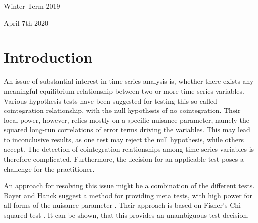 \documentclass[12pt,a4paper]{article}
\begin{document}
\begin{titlepage}
  \noindent\begin{minipage}[t]{0.5\textwidth}
  \end{minipage}
  \begin{minipage}[t]{0.7\textwidth}
  \hspace{1cm}Winter Term 2019
  \end{minipage}

  \noindent\begin{minipage}[t]{0.5\textwidth}
  \end{minipage}
  \begin{minipage}[t]{0.7\textwidth}
  \hspace{1cm}April 7th 2020
  \end{minipage}

\end{titlepage}

\restoregeometry


{
\hypersetup{linkcolor=black}
\setcounter{tocdepth}{3}
\tableofcontents
}
\newpage
\listoftables
\newpage
\listoffigures
\newpage
{} 
\hypertarget{introduction}{%
\section{Introduction}\label{introduction}}

An issue of substantial interest in time series analysis is, whether
there exists any meaningful equilibrium relationship between two or more
time series variables. Various hypothesis tests have been suggested for
testing this so-called cointegration relationship, with the null
hypothesis of no cointegration. Their local power, however, relies
mostly on a specific nuisance parameter, namely the squared long-run
correlations of error terms driving the variables. This may lead to
inconclusive results, as one test may reject the null hypothesis, while
others accept. The detection of cointegration relationships among time
series variables is therefore complicated. Furthermore, the decision for
an applicable test poses a challenge for the practitioner.

An approach for resolving this issue might be a combination of the
different tests. Bayer and Hanck suggest a method for providing meta
tests, with high power for all forms of the nuisance parameter
\autocite{Bayerhanck2009}. Their approach is based on Fisher's
Chi-squared test \autocite{Fisher1925}. It can be shown, that this
provides an unambiguous test decision.
\end{document}
